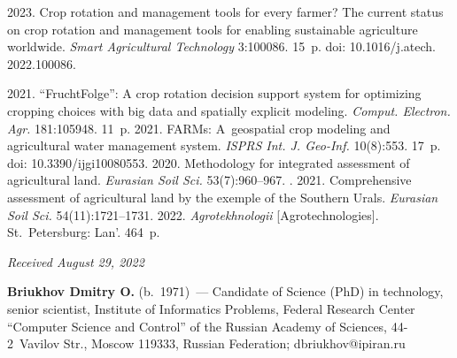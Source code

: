 \vspace*{6pt}

  \begin{multicols}{2}

\renewcommand{\bibname}{\protect\rmfamily References}

{\small\frenchspacing
 {%
 \begin{thebibliography}{9}
 2023. Crop 
rotation and management tools for every farmer? The current status on crop 
rotation and management tools for enabling sustainable agriculture worldwide. 
\textit{Smart Agricultural Technology} 3:100086. 15~p.  doi: 10.1016/j.atech. 2022.100086.
{

}
 2021. ``FruchtFolge'': A crop rotation 
decision support system for optimizing cropping choices with big data and 
spatially explicit modeling. \textit{Comput. Electron. Agr.} 181:105948.  11~p.
 2021. FARMs: A~geospatial crop modeling and 
agricultural water management system. \textit{\mbox{ISPRS} Int. J. Geo-Inf.} 10(8):553. 17~p.
doi: 10.3390/\linebreak ijgi10080553.
 2020. Methodology for integrated assessment of agricultural 
land. \textit{Eurasian Soil Sci.} 53(7):960--967.
. 2021. 
Comprehensive assessment of agricultural land by the exemple of the Southern Urals. \textit{Eurasian Soil Sci.} 54(11):1721--1731.
 2022. \textit{Agrotekhnologii} [Agrotechnologies]. 
St.\ Petersburg: Lan'. 464~p.
\end{thebibliography}

 }
 }

\end{multicols}

\vspace*{-6pt}

\hfill{\small\textit{Received August 29, 2022}}

\vspace*{-16pt}
    
    \Contr
    \noindent
    \textbf{Briukhov Dmitry O.} (b.\ 1971)~--- Candidate of Science (PhD) in 
technology, senior scientist, Institute of Informatics Problems, Federal Research 
Center ``Computer Science and Control'' of the Russian Academy of Sciences, \mbox{44-2}~Vavilov Str., Moscow 119333, Russian Federation; 
\mbox{dbriukhov@ipiran.ru}
    
